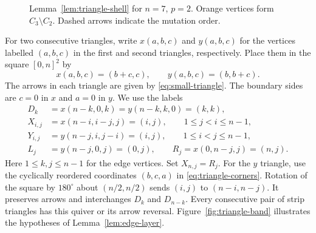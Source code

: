 \documentclass[12pt, letter]{amsart}
\theoremstyle{definition}
\numberwithin{equation}{section}
\begin{document}
\begin{figure}
\caption{Lemma~\ref{lem:triangle-shell} for $n=7$, $p=2$.
Orange vertices form $C_3\setminus C_2$. Dashed arrows indicate the mutation order.}
\label{fig:shell}
\end{figure}

For two consecutive triangles, write $x(a,b,c)$ and $y(a,b,c)$
for the vertices labelled $(a,b,c)$ in the first and second triangles, respectively.
Place them in the square $[0,n]^2$ by
\[
 x(a,b,c)=(b+c,c),\qquad y(a,b,c)=(b,b+c).
\]
The arrows in each triangle are given by \eqref{eq:small-triangle}.
The boundary sides are $c=0$ in $x$ and $a=0$ in $y$.
We use the labels
\begin{equation}\label{eq:grid-labels}
 \begin{split}
 D_k&=x(n-k,0,k)=y(n-k,k,0)=(k,k),\\
 X_{i,j}&=x(n-i,i-j,j)=(i,j),\qquad 1\le j<i\le n-1,\\
 Y_{i,j}&=y(n-j,i,j-i)=(i,j),\qquad 1\le i<j\le n-1,\\
 L_j&=y(n-j,0,j)=(0,j),\qquad
 R_j=x(0,n-j,j)=(n,j).
 \end{split}
\end{equation}
Here $1\le k,j\le n-1$ for the edge vertices.
Set $X_{n,j}=R_j$.
For the $y$ triangle, use the cyclically reordered coordinates
$(b,c,a)$ in \eqref{eq:triangle-corners}.
Rotation of the square by $180^\circ$ about $(n/2,n/2)$ sends
$(i,j)$ to $(n-i,n-j)$. It preserves arrows and interchanges $D_k$ and $D_{n-k}$.
Every consecutive pair of strip triangles has this quiver
or its arrow reversal.
Figure~\ref{fig:triangle-band} illustrates the hypotheses of Lemma~\ref{lem:edge-layer}.
\end{document}
